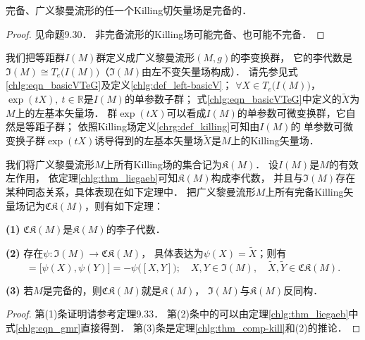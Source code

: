 \begin{theorem}\label{chlg:thm_comp-kill}
    完备、广义黎曼流形的任一个Killing切矢量场是完备的．
\end{theorem}
\begin{proof}
    见\parencite{oneill1983}命题9.30．
    非完备流形的Killing场可能完备、也可能不完备．
\end{proof}


我们把等距群$I(M)$群定义成广义黎曼流形$(M,g)$的李变换群，
它的李代数是$\mathfrak{I}(M)\cong T_e\bigl(I(M)\bigr)$（$\mathfrak{I}(M)$由左不变矢量场构成）．
请先参见式\eqref{chlg:eqn_basicVTeG}及定义\ref{chlg:def_left-basicV}；
$\forall X\in T_e\bigl(I(M)\bigr)$，$\exp(t X),\ t\in \mathbb{R}$是$I(M)$的单参数子群；
式\eqref{chlg:eqn_basicVTeG}中定义的$\widetilde{X}$为$M$上的左基本矢量场．
群$\exp(t X)$可以看成$I(M)$的单参数可微变换群，它自然是{\kaishu 等距}子群；
依照Killing场定义\ref{chrg:def_killing}可知由$I(M)$的
单参数可微变换子群$\exp(t X)$诱导得到的左基本矢量场$\widetilde{X}$是$M$上的Killing矢量场．



我们将广义黎曼流形$M$上所有Killing场的集合记为$\mathfrak{K}(M)$．
设$I(M)$是$M$的有效左作用，
依定理\ref{chlg:thm_liegaeb}可知$\mathfrak{K}(M)$构成李代数，
并且与$\mathfrak{I}(M)$存在某种同态关系，具体表现在如下定理中．
把广义黎曼流形$M$上所有{\kaishu 完备}Killing矢量场记为$\mathfrak{CK}(M)$，则有如下定理：
\begin{theorem}\label{chlg:thm_la-killing}
    {\bfseries (1)} $\mathfrak{CK}(M)$是$\mathfrak{K}(M)$的李子代数．
    
    {\bfseries (2)} 存在$\psi:\mathfrak{I}(M) \to \mathfrak{CK}(M)$，
    具体表达为$\psi(X)=\widetilde{X}$；则有
    \begin{equation*}
        [\widetilde{X},\widetilde{Y}]=\bigl[\psi(X),\psi(Y)\bigr]=-\psi\bigl([X,Y]\bigr);
        \quad X,Y\in\mathfrak{I}(M), \quad  
        \widetilde{X},\widetilde{Y} \in \mathfrak{CK}(M).
    \end{equation*}
    
    {\bfseries (3)} 若$M$是完备的，则$\mathfrak{CK}(M)$就是$\mathfrak{K}(M)$，
    $\mathfrak{I}(M)$与$\mathfrak{K}(M)$反同构．
\end{theorem}
\begin{proof}
    第(1)条证明请参考\parencite{oneill1983}定理9.33．
    第(2)条中的可以由定理\ref{chlg:thm_liegaeb}中式\eqref{chlg:eqn_gmr}直接得到．
    第(3)条是定理\ref{chlg:thm_comp-kill}和(2)的推论．
\end{proof}

